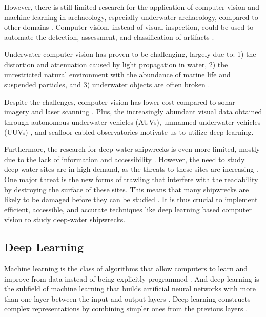 \documentclass[a4paper, 11pt, oneside]{article}
\begin{document}
  However, there is still limited research for the application of computer vision and machine learning in archaeology,
  especially underwater archaeology, compared to other domains \cite{maaten2007computer, qin2015underwater}.
  Computer vision, instead of visual inspection, could be used to automate the detection, assessment, and classification
  of artifacts \cite{maaten2007computer}.

  Underwater computer vision has proven to be challenging, largely due to: 1) the distortion and attenuation caused by
  light propagation in water, 2) the unrestricted natural environment with the abundance of marine life and suspended
  particles, and 3) underwater objects are often broken
  \cite{qin2015underwater, rizzini2015investigation, lu2017underwater, mccarthy20193d}.

  Despite the challenges, computer vision has lower cost \cite{rizzini2015investigation} compared to sonar imagery
  \cite{abu2019statistically} and laser scanning \cite{gordon1992use}. Plus, the increasingly abundant visual data obtained
  through autonomous underwater vehicles (AUVs), unmanned underwater vehicles (UUVs)
  \cite{lu2017underwater, moniruzzaman2017deep}, and seafloor cabled observatories \cite{qin2015underwater} motivate us
  to utilize deep learning.

  Furthermore, the research for deep-water shipwrecks is even more limited, mostly due to the lack of information and
  accessibility \cite{drap2015underwater}. However, the need to study deep-water sites are in high demand, as the threats
  to these sites are increasing \cite{drap2015underwater}. One major threat is the new forms of trawling that interfere
  with the readability by destroying the surface of these sites\cite{drap2015underwater}. This means that many
  shipwrecks are likely to be damaged before they can be studied \cite{drap2015underwater}. It is thus crucial to implement
  efficient, accessible, and accurate techniques like deep learning based computer vision to study deep-water shipwrecks.

  \subsection{Deep Learning}

  Machine learning is the class of algorithms that allow computers to learn and improve from data instead of being
  explicitly programmed \cite{samuel1959some, geron2019hands}. And deep learning is the subfield of machine learning that
  builds artificial neural networks with more than one layer between the input and output layers
  \cite{geron2019hands, burkov2019hundred, zhang2018definition}. Deep learning constructs complex representations by
  combining simpler ones from the previous layers \cite{goodfellow2016deep}.
\end{document}
